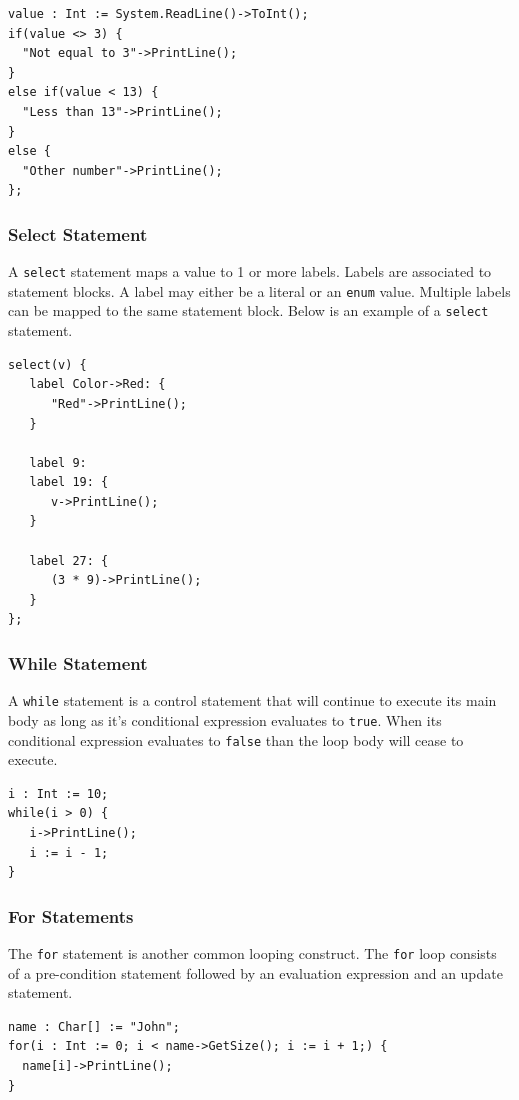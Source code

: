 \documentclass[12pt]{article}
\begin{document}
\begin{verbatim}
value : Int := System.ReadLine()->ToInt();
if(value <> 3) {
  "Not equal to 3"->PrintLine();
}
else if(value < 13) {
  "Less than 13"->PrintLine();
}
else {
  "Other number"->PrintLine();
};
\end{verbatim}

\subsubsection{Select Statement}

A \texttt{select} statement maps a value to 1 or more labels.  Labels are associated to statement blocks.  A label may either be a literal or an \texttt{enum} value.  Multiple labels can be mapped to the same statement block.  Below is an example of a \texttt{select} statement.

\begin{verbatim}
select(v) {
   label Color->Red: {
      "Red"->PrintLine();
   }

   label 9:
   label 19: {
      v->PrintLine();
   }

   label 27: {
      (3 * 9)->PrintLine();
   }
};
\end{verbatim}

\subsubsection{While Statement}

A \texttt{while} statement is a control statement that will continue to execute its main body as long as it's conditional expression evaluates to \texttt{true}.  When its conditional expression evaluates to \texttt{false} than the loop body will cease to execute.

\begin{verbatim}
i : Int := 10;
while(i > 0) {
   i->PrintLine();
   i := i - 1;
}
\end{verbatim}

\subsubsection{For Statements}

The \texttt{for} statement is another common looping construct.  The \texttt{for} loop consists of a pre-condition statement followed by an evaluation expression and an update statement.

\begin{verbatim}
name : Char[] := "John";
for(i : Int := 0; i < name->GetSize(); i := i + 1;) {
  name[i]->PrintLine();
}
\end{verbatim}
\end{document}
